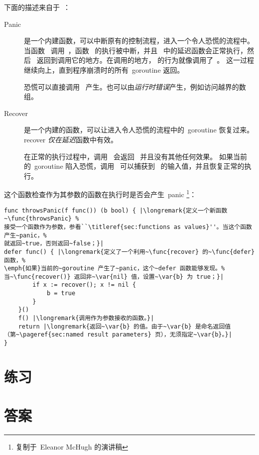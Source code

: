 下面的描述来自于~\cite{go_blog_panic}：
\begin{description}
\item[Panic]{是一个内建函数，可以中断原有的控制流程，进入一个令人恐慌的流程中。
当函数~ 调用~，函数~ 的执行被中断，并且~ 
中的延迟函数会正常执行，然后~ 返回到调用它的地方。在调用的地方，
 的行为就像调用了~。
这一过程继续向上，直到程序崩溃时的所有~goroutine 返回。

恐慌可以直接调用~ 产生。也可以由\emph{运行时错误}产生，例如访问越界的数组。}

\item[Recover]{是一个内建的函数，可以让进入令人恐慌的流程中的~goroutine 恢复过来。
recover \emph{仅在}\emph{延迟}函数中有效。

在正常的执行过程中，调用~ 会返回~ 并且没有其他任何效果。
如果当前的~goroutine 陷入恐慌，调用~ 可以捕获到~ 的输入值，并且恢复正常的执行。}
\end{description}

这个函数检查作为其参数的函数在执行时是否会产生~panic
\footnote{复制于~Eleanor McHugh 的演讲稿}：
\begin{lstlisting}
func throwsPanic(f func()) (b bool) { |\longremark{定义一个新函数~\func{throwsPanic} %
接受一个函数作为参数，参看``\titleref{sec:functions as values}''。当这个函数产生~panic，%
就返回~true，否则返回~false；}|
defer func() { |\longremark{定义了一个利用~\func{recover} 的~\func{defer} 函数，%
\emph{如果}当前的~goroutine 产生了~panic，这个~defer 函数能够发现。%
当~\func{recover()} 返回非~\var{nil} 值，设置~\var{b} 为 true；}|
        if x := recover(); x != nil {
            b = true
        }
    }()
    f() |\longremark{调用作为参数接收的函数。}|
    return |\longremark{返回~\var{b} 的值。由于~\var{b} 是命名返回值
（第~\pageref{sec:named result parameters} 页），无须指定~\var{b}。}|
}
\end{lstlisting}
\showremarks

\section{练习}




















\cleardoublepage
\section{答案}
\shipoutAnswer

